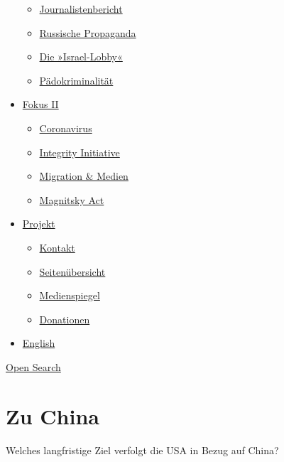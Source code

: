 \begin{itemize}
  \begin{itemize}
  \tightlist
  \item
    \href{https://swprs.org/bericht-eines-journalisten/}{Journalistenbericht}
  \item
    \href{https://swprs.org/russische-propaganda/}{Russische Propaganda}
  \item
    \href{https://swprs.org/die-israel-lobby-fakten-und-mythen/}{Die
    »Israel-Lobby«}
  \item
    \href{https://swprs.org/geopolitik-und-paedokriminalitaet/}{Pädokriminalität}
  \end{itemize}
\item
  \href{https://swprs.org/migration-und-medien/}{Fokus II}

  \begin{itemize}
  \tightlist
  \item
    \href{https://swprs.org/covid-19-hinweis-ii/}{Coronavirus}
  \item
    \href{https://swprs.org/die-integrity-initiative/}{Integrity
    Initiative}
  \item
    \href{https://swprs.org/migration-und-medien/}{Migration \& Medien}
  \item
    \href{https://swprs.org/der-fall-magnitsky/}{Magnitsky Act}
  \end{itemize}
\item
  \href{https://swprs.org/kontakt/}{Projekt}

  \begin{itemize}
  \tightlist
  \item
    \href{https://swprs.org/kontakt/}{Kontakt}
  \item
    \href{https://swprs.org/uebersicht/}{Seitenübersicht}
  \item
    \href{https://swprs.org/medienspiegel/}{Medienspiegel}
  \item
    \href{https://swprs.org/donationen/}{Donationen}
  \end{itemize}
\item
  \href{https://swprs.org/contact/}{English}
\end{itemize}

\protect\hyperlink{}{Open Search}

\hypertarget{zu-china}{%
\section{Zu China}\label{zu-china}}

Welches langfristige Ziel verfolgt die USA in Bezug auf China?

